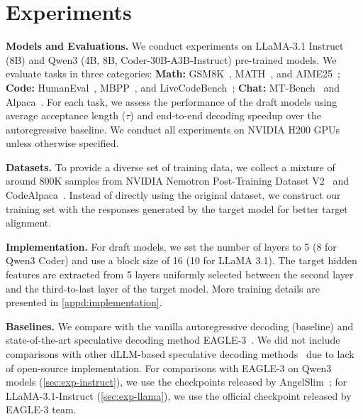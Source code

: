 \section{Experiments}
\label{sec:experiments}

\textbf{Models and Evaluations.  } We conduct experiments on LLaMA-3.1 Instruct (8B) and Qwen3 (4B, 8B, Coder-30B-A3B-Instruct) pre-trained models. We evaluate tasks in three categories: \textbf{Math:} GSM8K~\citep{cobbe2021training}, MATH~\citep{lightman2023let}, and AIME25~\citep{AIME}; \textbf{Code:} HumanEval~\citep{chen2021evaluating}, MBPP~\citep{austin2021program}, and LiveCodeBench~\citep{jain2024livecodebench}; \textbf{Chat:} MT-Bench~\citep{zheng2023judging} and Alpaca~\citep{alpaca}. For each task, we assess the performance of the draft models using average acceptance length ($\tau$) and end-to-end decoding speedup over the autoregressive baseline. We conduct all experiments on NVIDIA H200 GPUs unless otherwise specified.

\textbf{Datasets.  } To provide a diverse set of training data, we collect a mixture of around 800K samples from NVIDIA Nemotron Post-Training Dataset V2~\citep{NemotronPostTrainingDatasetV2} and CodeAlpaca~\citep{codealpaca}.
Instead of directly using the original dataset, we construct our training set with the responses generated by the target model for better target alignment.

\textbf{Implementation.  } For \method draft models, we set the number of layers to 5 (8 for Qwen3 Coder) and use a block size of 16 (10 for LLaMA 3.1). The target hidden features are extracted from 5 layers uniformly selected between the second layer and the third-to-last layer of the target model. More training details are presented in \autoref{appd:implementation}.

\textbf{Baselines.  } We compare \method with the vanilla autoregressive decoding (baseline) and state-of-the-art speculative decoding method EAGLE-3~\citep{li2025eagle3scalinginferenceacceleration}. We did not include comparisons with other dLLM-based speculative decoding methods~\citep{liu2025tidarthinkdiffusiontalk,samragh2025llmknowsfutureuncovering,li2025diffuspecunlockingdiffusionlanguage,sandler2025specdiff2scalingdiffusiondrafter} due to lack of open-source implementation.
For comparisons with EAGLE-3 on Qwen3 models (\autoref{sec:exp-instruct}), we use the checkpoints released by AngelSlim~\citep{AngelSlim2025}; for LLaMA-3.1-Instruct (\autoref{sec:exp-llama}), we use the official checkpoint released by EAGLE-3 team.

